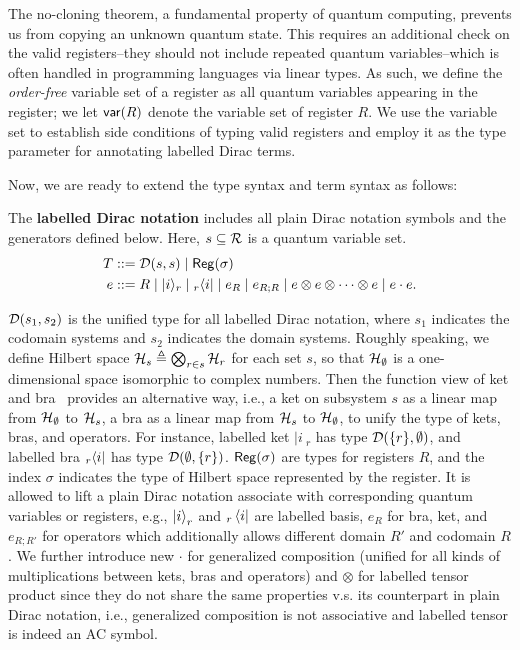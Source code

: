 The no-cloning theorem, a fundamental property of quantum computing, prevents us from copying an unknown quantum state. This requires an additional check on the valid registers--they should not include repeated quantum variables--which is often handled in programming languages via linear types. As such, we define the \emph{order-free} variable set of a register as all quantum variables appearing in the register; we let $\mathsf{var}(R)$ denote the variable set of register $R$.
We use the variable set to establish side conditions of typing valid registers and employ it as the type parameter for annotating labelled Dirac terms.

Now, we are ready to extend the type syntax and term syntax as follows:
\begin{definition}
  The \textbf{labelled Dirac notation} includes all plain Dirac notation symbols and the generators defined below.
  Here, $s\subseteq \mathcal{R}$ is a quantum variable set.
  \begin{align*}
    T & ::= \mathcal{D}(s,s) \mid \mathsf{Reg}(\sigma) \\
    e & ::= R \mid |i\rangle_r \mid {}_r\langle i| \mid e_R \mid e_{R;R} \mid
    e \otimes e \otimes \cdots \otimes e \mid e \cdot e.
  \end{align*}
\end{definition}
$\mathcal{D}(s_1, s_2)$ is the unified type for all labelled Dirac notation, where $s_1$ indicates the codomain systems and $s_2$ indicates the domain systems.
Roughly speaking, we define Hilbert space ${\mathcal{H}}_s\triangleq\bigotimes_{r\in s}{\mathcal{H}}_r$ for each set $s$, so that ${\mathcal{H}}_{\emptyset}$ is a one-dimensional space isomorphic to complex numbers. Then the function view of ket and bra~\cite{Zhou2023} provides an alternative way, i.e., a ket on subsystem $s$ as a linear map from ${\mathcal{H}}_{\emptyset}$ to ${\mathcal{H}}_s$, a bra as a linear map from ${\mathcal{H}}_s$ to ${\mathcal{H}}_{\emptyset}$, to unify the type of kets, bras, and operators. For instance, labelled ket $|i\>_r$ has type $\mathcal{D}(\{r\}, \emptyset)$, and labelled bra ${}_r\langle i|$ has type $\mathcal{D}(\emptyset, \{r\})$.
$\mathsf{Reg}(\sigma)$ are types for registers $R$, and the index $\sigma$ indicates the type of Hilbert space represented by the register.
It is allowed to lift a plain Dirac notation associate with corresponding quantum variables or registers, e.g., $\ket{i}_r$ and ${}_r\bra{i}$ are labelled basis, $e_R$ for bra, ket, and $e_{R;R'}$ for operators which additionally allows different domain $R'$ and codomain $R$.
We further introduce new $\cdot$ for generalized composition (unified for all kinds of multiplications between kets, bras and operators) and $\otimes$ for labelled tensor product since they do not share the same properties v.s. its counterpart in plain Dirac notation, i.e., generalized composition is not associative and labelled tensor is indeed an AC symbol.

